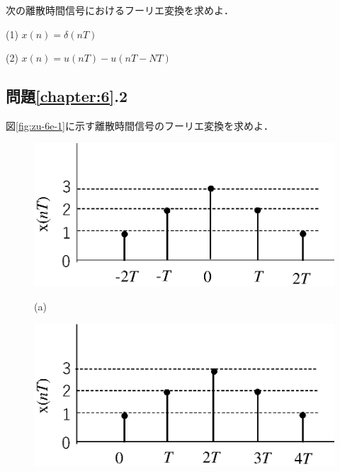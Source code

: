 次の離散時間信号におけるフーリエ変換を求めよ．

(1) $x(n)=\delta (nT)$

(2) $x(n)=u (nT)-u(nT-NT)$

\newpage

\subsection*{問題\ref{chapter:6}.2}

図\ref{fig:zu-6e-1}に示す離散時間信号のフーリエ変換を求めよ．

\begin{figure}[H]
\begin{center}
\begin{minipage}{.35\textwidth}
\begin{center}
\includegraphics[width=.98\textwidth]{fig/zu-6e-1a.eps}

(a)
\end{center}
\end{minipage}
\begin{minipage}{.35\textwidth}
\begin{center}
\includegraphics[width=.98\textwidth]{fig/zu-6e-1b.eps}


\end{center}
\end{minipage}
\end{center}
\end{figure}
